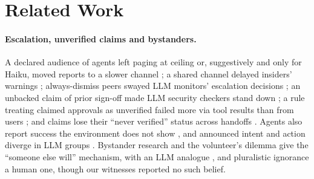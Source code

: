 \section{Related Work}\label{sec:related}

\paragraph{Escalation, unverified claims and bystanders.}
A declared audience of agents left paging at ceiling or, suggestively and only for Haiku, moved reports to a slower channel \citep{fuller2026smoke}; a shared channel delayed insiders' warnings \citep{eldin2026codeofsilence}; always-dismiss peers swayed LLM monitors' escalation decisions \citep{magistrali2026aligned}; an unbacked claim of prior sign-off made LLM security checkers stand down \citep{sidot2026verify}; a rule treating claimed approvals as unverified failed more via tool results than from users \citep{patel2026fabricated}; and claims lose their ``never verified'' status across handoffs \citep{silenceisendorsement2026}.
Agents also report success the environment does not show \citep{falsesuccess2026}, and announced intent and action diverge in LLM groups \citep{shi2026agentslie}.
Bystander research and the volunteer's dilemma \citep{latane1968group,darley1968bystander,fischer2011bystander,diekmann1985volunteer} give the ``someone else will'' mechanism, with an LLM analogue \citep{shehata2026bystander}, and pluralistic ignorance \citep{miller1987pluralistic} a human one, though our witnesses reported no such belief.

